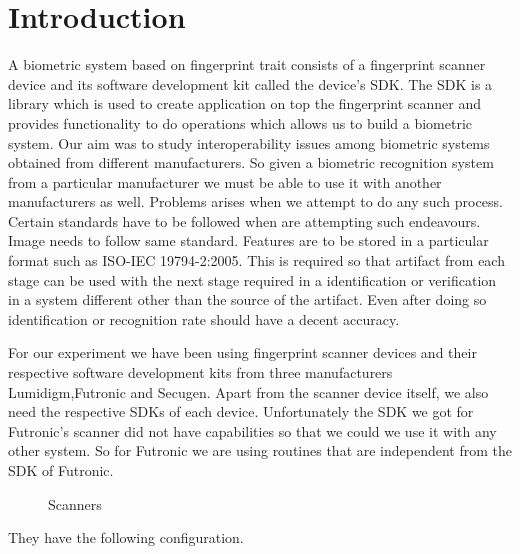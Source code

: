 \documentclass{article}
\begin{document}
\section*{Introduction}
A biometric system based on fingerprint trait consists of a fingerprint scanner device and its software development kit called the device's SDK.
The SDK is a library which is used to create application on top the fingerprint scanner and provides functionality to do operations 
which allows us to build a biometric system. Our aim was to study interoperability issues among biometric systems obtained from different manufacturers.
So given a biometric recognition system from a particular manufacturer we must be able to use it with another manufacturers as well. Problems arises when 
we attempt to do any such process. Certain standards have to be followed when are attempting such endeavours. Image needs to follow same standard. Features 
are to be stored in a particular format such as ISO-IEC 19794-2:2005. This is required so that artifact from each stage can be used with the next stage required
in a identification or verification in a system different other than the source of the artifact. Even after doing so identification or recognition rate should have a decent accuracy.

For our experiment we have been using fingerprint scanner devices and their respective software development kits from three manufacturers
Lumidigm,Futronic and Secugen. Apart from the scanner device itself, we also need the respective SDKs of each device. Unfortunately the SDK we got for Futronic's scanner
did not have capabilities so that we could we use it with any other system. So for Futronic we are using routines that are independent from the SDK of Futronic.
\begin{figure}
	\begin{center}
	\end{center}
	\caption{Scanners}
	\label{fig:scanners}

\end{figure} 
							\vspace{2mm}
They have the following configuration.
\end{document}

